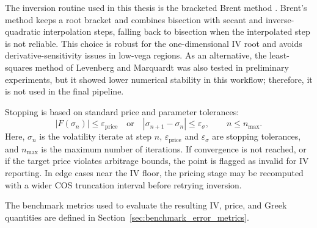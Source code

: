 The inversion routine used in this thesis is the bracketed Brent method \cite[Ch.~9]{press2007numerical}. Brent's method keeps a root bracket and combines bisection with secant and inverse-quadratic interpolation steps, falling back to bisection when the interpolated step is not reliable. This choice is robust for the one-dimensional IV root and avoids derivative-sensitivity issues in low-vega regions. As an alternative, the least-squares method of Levenberg and Marquardt \cite{levenberg1944,marquardt1963} was also tested in preliminary experiments, but it showed lower numerical stability in this workflow; therefore, it is not used in the final pipeline.

Stopping is based on standard price and parameter tolerances:
\begin{equation}
    |F(\sigma_n)|\le \varepsilon_{\text{price}}
    \quad\text{or}\quad
    |\sigma_{n+1}-\sigma_n|\le \varepsilon_{\sigma},
    \qquad n\le n_{\max}.
\end{equation}
Here, $\sigma_n$ is the volatility iterate at step $n$, $\varepsilon_{\text{price}}$ and $\varepsilon_\sigma$ are stopping tolerances, and $n_{\max}$ is the maximum number of iterations. If convergence is not reached, or if the target price violates arbitrage bounds, the point is flagged as invalid for IV reporting. In edge cases near the IV floor, the pricing stage may be recomputed with a wider COS truncation interval before retrying inversion.

The benchmark metrics used to evaluate the resulting IV, price, and Greek quantities are defined in Section~\ref{sec:benchmark_error_metrics}.

